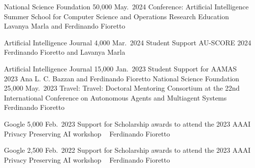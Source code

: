 \vspace{-16pt}

\begin{projects}
	\grantentrySinglePI
	{National Science Foundation}
	{50,000}
	{May.~2024}{}
	{Conference: Artificial Intelligence Summer School for Computer Science and Operations Research Education}
	{~}
	{Lavanya Marla and Ferdinando Fioretto}

	\grantentrySinglePI
	{Artificial Intelligence Journal}
	{4,000}
	{Mar.~2024}{}
	{Student Support AU-SCORE 2024}
	{}
	{Ferdinando Fioretto and Lavanya Marla}

	\grantentrySinglePI
	{Artificial Intelligence Journal}
	{15,000}
	{Jan.~2023}{}
	{Student Support for AAMAS 2023}
	{}
	{Ana L. C. Bazzan and Ferdinando Fioretto}
	\grantentrySinglePI
	{National Science Foundation}
	{25,000}
	{May.~2023}{}
	{Travel: Travel: Doctoral Mentoring Consortium at the 22nd International Conference on Autonomous Agents and Multiagent Systems}
	{~}
	{Ferdinando Fioretto}

	\grantentrySinglePI
	{Google}
	{5,000}
	{Feb.~2023}{}
	{Support for Scholarship awards to attend the 2023 AAAI Privacy Preserving AI workshop}
	{~}
	{Ferdinando Fioretto}

	\grantentrySinglePI
	{Google}
	{2,500}
	{Feb.~2022}{}
	{Support for Scholarship awards to attend the 2023 AAAI Privacy Preserving AI workshop}
	{~}
	{Ferdinando Fioretto}
\end{projects}


